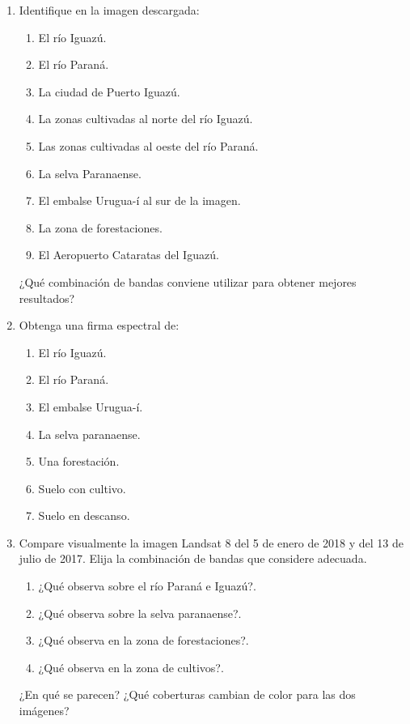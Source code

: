 \begin{enumerate}
  \item Identifique en la imagen descargada:
  \begin{enumerate}
    \item El río Iguazú.
    \item El río Paraná.
    \item La ciudad de Puerto Iguazú.
    \item La zonas cultivadas al norte del río Iguazú.
    \item Las zonas cultivadas al oeste del río Paraná.
    \item La selva Paranaense.
    \item El embalse Urugua-í al sur de la imagen.
    \item La zona de forestaciones.
    \item El Aeropuerto Cataratas del Iguazú.
  \end{enumerate}
  ¿Qué combinación de bandas conviene utilizar para obtener mejores resultados?

  \item Obtenga una firma espectral de:
  \begin{enumerate}
    \item El río Iguazú.
    \item El río Paraná.
    \item El embalse Urugua-í.
    \item La selva paranaense.
    \item Una forestación.
    \item Suelo con cultivo.
    \item Suelo en descanso.
  \end{enumerate}

  \item Compare visualmente la imagen Landsat 8 del 5 de enero de 2018 y del 13 de julio de 2017. Elija la combinación de bandas que considere adecuada.
  \begin{enumerate}
    \item ¿Qué observa sobre el río Paraná e Iguazú?.
    \item ¿Qué observa sobre la selva paranaense?.
    \item ¿Qué  observa en la zona de forestaciones?.
    \item ¿Qué  observa en la zona de cultivos?.
  \end{enumerate}
  ¿En qué se parecen? ¿Qué coberturas cambian de color para las dos imágenes?


\end{enumerate}

